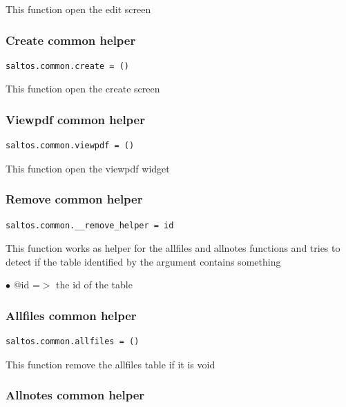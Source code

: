 \documentclass[a4paper]{article}
\begin{document}
This function open the edit screen

\hypertarget{toc127}{}
\subsubsection{Create common helper}

\begin{lstlisting}
saltos.common.create = ()
\end{lstlisting}

This function open the create screen

\hypertarget{toc128}{}
\subsubsection{Viewpdf common helper}

\begin{lstlisting}
saltos.common.viewpdf = ()
\end{lstlisting}

This function open the viewpdf widget

\hypertarget{toc129}{}
\subsubsection{Remove common helper}

\begin{lstlisting}
saltos.common.__remove_helper = id
\end{lstlisting}

This function works as helper for the allfiles and allnotes functions and
tries to detect if the table identified by the argument contains something

\begin{compactitem}
\item[\color{myblue}$\bullet$] @id =$>$ the id of the table
\end{compactitem}

\hypertarget{toc130}{}
\subsubsection{Allfiles common helper}

\begin{lstlisting}
saltos.common.allfiles = ()
\end{lstlisting}

This function remove the allfiles table if it is void

\hypertarget{toc131}{}
\subsubsection{Allnotes common helper}
\end{document}
